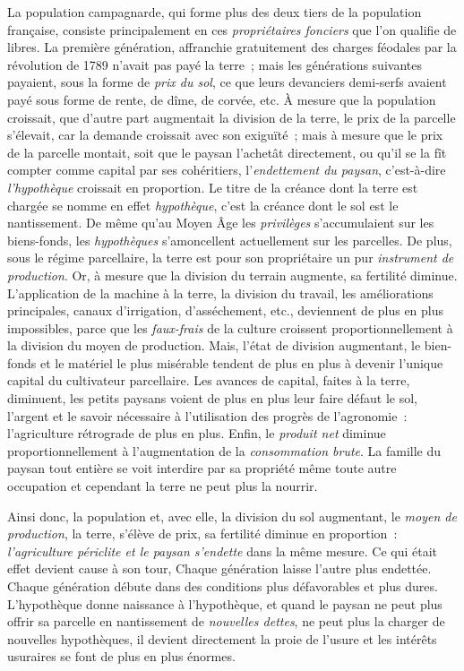 \documentclass[french,twoside]{book} %
\begin{document}
La population campagnarde, qui forme plus des deux tiers de la population française, consiste principalement en ces \emph{propriétaires fonciers} que l’on qualifie de libres. La première génération, affranchie gratuitement des charges féodales par la révolution de 1789 n’avait pas payé la terre ; mais les générations suivantes payaient, sous la forme de \emph{prix du sol}, ce que leurs devanciers demi-serfs avaient payé sous forme de rente, de dîme, de corvée, etc. À mesure que la population croissait, que d’autre part augmentait la division de la terre, le prix de la parcelle s’élevait, car la demande croissait avec son exiguïté ; mais à mesure que le prix de la parcelle montait, soit que le paysan l’achetât directement, ou qu’il se la fît compter comme capital par ses cohéritiers, l’\emph{endettement du paysan}, c’est-à-dire \emph{l’hypothèque} croissait en proportion. Le titre de la créance dont la terre est chargée se nomme en effet \emph{hypothèque}, c’est la créance dont le sol est le nantissement. De même qu’au Moyen Âge les \emph{privilèges} s’accumulaient sur les biens-fonds, les \emph{hypothèques} s’amoncellent actuellement sur les parcelles. De plus, sous le régime parcellaire, la terre est pour son propriétaire un pur \emph{instrument de production}. Or, à mesure que la division du terrain augmente, sa fertilité diminue. L’application de la machine à la terre, la division du travail, les améliorations principales, canaux d’irrigation, d’asséchement, etc., deviennent de plus en plus impossibles, parce que les \emph{faux-frais} de la culture croissent proportionnellement à la division du moyen de production. Mais, l’état de division augmentant, le bien-fonds et le matériel le plus misérable tendent de plus en plus à devenir l’unique capital du cultivateur parcellaire. Les avances de capital, faites à la terre, diminuent, les petits paysans voient de plus en plus leur faire défaut le sol, l’argent et le savoir nécessaire à l’utilisation des progrès de l’agronomie : l’agriculture rétrograde de plus en plus. Enfin, le \emph{produit net} diminue proportionnellement à l’augmentation de la \emph{consommation brute}. La famille du paysan tout entière se voit interdire par sa propriété même toute autre occupation et cependant la terre ne peut plus la nourrir.\par
Ainsi donc, la population et, avec elle, la division du sol augmentant, le \emph{moyen de production}, la terre, s’élève de prix, sa fertilité diminue en proportion : \emph{l’agriculture périclite et le paysan s’endette} dans la même mesure. Ce qui était effet devient cause à son tour, Chaque génération laisse l’autre plus endettée. Chaque génération débute dans des conditions plus défavorables et plus dures. L’hypothèque donne naissance à l’hypothèque, et quand le paysan ne peut plus offrir sa parcelle en nantissement de \emph{nouvelles dettes}, ne peut plus la charger de nouvelles hypothèques, il devient directement la proie de l’usure et les intérêts usuraires se font de plus en plus énormes.\par
\end{document}
